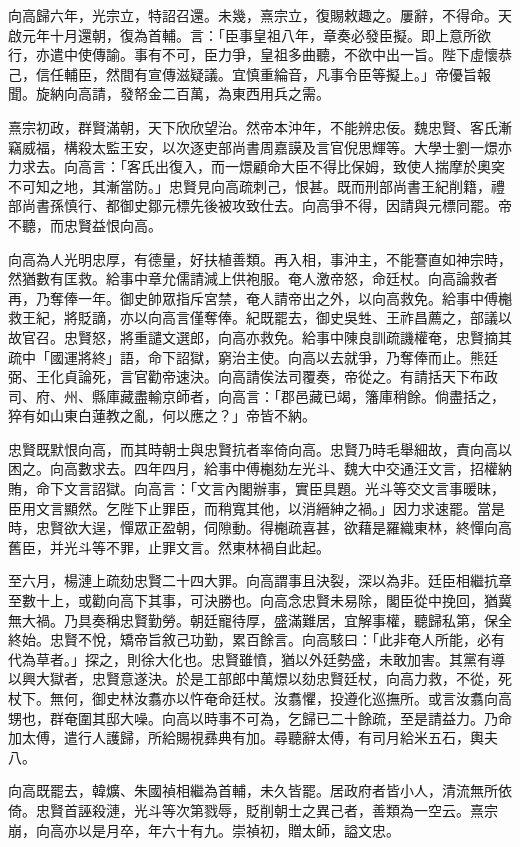 \begin{pinyinscope}
向高歸六年，光宗立，特詔召還。未幾，熹宗立，復賜敕趣之。屢辭，不得命。天啟元年十月還朝，復為首輔。言：「臣事皇祖八年，章奏必發臣擬。即上意所欲行，亦遣中使傳諭。事有不可，臣力爭，皇祖多曲聽，不欲中出一旨。陛下虛懷恭己，信任輔臣，然間有宣傳滋疑議。宜慎重綸音，凡事令臣等擬上。」帝優旨報聞。旋納向高請，發帑金二百萬，為東西用兵之需。

熹宗初政，群賢滿朝，天下欣欣望治。然帝本沖年，不能辨忠佞。魏忠賢、客氏漸竊威福，構殺太監王安，以次逐吏部尚書周嘉謨及言官倪思輝等。大學士劉一燝亦力求去。向高言：「客氏出復入，而一燝顧命大臣不得比保姆，致使人揣摩於奧穾不可知之地，其漸當防。」忠賢見向高疏刺己，恨甚。既而刑部尚書王紀削籍，禮部尚書孫慎行、都御史鄒元標先後被攻致仕去。向高爭不得，因請與元標同罷。帝不聽，而忠賢益恨向高。

向高為人光明忠厚，有德量，好扶植善類。再入相，事沖主，不能謇直如神宗時，然猶數有匡救。給事中章允儒請減上供袍服。奄人激帝怒，命廷杖。向高論救者再，乃奪俸一年。御史帥眾指斥宮禁，奄人請帝出之外，以向高救免。給事中傅櫆救王紀，將貶謫，亦以向高言僅奪俸。紀既罷去，御史吳甡、王祚昌薦之，部議以故官召。忠賢怒，將重譴文選郎，向高亦救免。給事中陳良訓疏譏權奄，忠賢摘其疏中「國運將終」語，命下詔獄，窮治主使。向高以去就爭，乃奪俸而止。熊廷弼、王化貞論死，言官勸帝速決。向高請俟法司覆奏，帝從之。有請括天下布政司、府、州、縣庫藏盡輸京師者，向高言：「郡邑藏已竭，籓庫稍餘。倘盡括之，猝有如山東白蓮教之亂，何以應之？」帝皆不納。

忠賢既默恨向高，而其時朝士與忠賢抗者率倚向高。忠賢乃時毛舉細故，責向高以困之。向高數求去。四年四月，給事中傅櫆劾左光斗、魏大中交通汪文言，招權納賄，命下文言詔獄。向高言：「文言內閣辦事，實臣具題。光斗等交文言事暖昧，臣用文言顯然。乞陛下止罪臣，而稍寬其他，以消縉紳之禍。」因力求速罷。當是時，忠賢欲大逞，憚眾正盈朝，伺隙動。得櫆疏喜甚，欲藉是羅織東林，終憚向高舊臣，并光斗等不罪，止罪文言。然東林禍自此起。

至六月，楊漣上疏劾忠賢二十四大罪。向高謂事且決裂，深以為非。廷臣相繼抗章至數十上，或勸向高下其事，可決勝也。向高念忠賢未易除，閣臣從中挽回，猶冀無大禍。乃具奏稱忠賢勤勞。朝廷寵待厚，盛滿難居，宜解事權，聽歸私第，保全終始。忠賢不悅，矯帝旨敘己功勤，累百餘言。向高駭曰：「此非奄人所能，必有代為草者。」探之，則徐大化也。忠賢雖憤，猶以外廷勢盛，未敢加害。其黨有導以興大獄者，忠賢意遂決。於是工部郎中萬燝以劾忠賢廷杖，向高力救，不從，死杖下。無何，御史林汝翥亦以忤奄命廷杖。汝翥懼，投遵化巡撫所。或言汝翥向高甥也，群奄圍其邸大噪。向高以時事不可為，乞歸已二十餘疏，至是請益力。乃命加太傅，遣行人護歸，所給賜視彞典有加。尋聽辭太傅，有司月給米五石，輿夫八。

向高既罷去，韓爌、朱國禎相繼為首輔，未久皆罷。居政府者皆小人，清流無所依倚。忠賢首誣殺漣，光斗等次第戮辱，貶削朝士之異己者，善類為一空云。熹宗崩，向高亦以是月卒，年六十有九。崇禎初，贈太師，謚文忠。


\end{pinyinscope}
